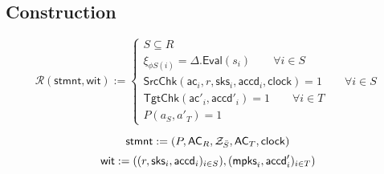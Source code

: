 \documentclass{article}      	%
\begin{document}
\subsection*{Construction}

\begin{equation*}
\mathcal{R}(\mathsf{stmnt}, \mathsf{wit}) := \begin{cases} 
    S \subseteq R \\ 
    \xi_{\phi S(i)} = \Delta.\mathsf{Eval}(s_i) \qquad \forall i \in S \\
    \mathsf{SrcChk}(\mathsf{ac}_i, r, \mathsf{sks}_i, \mathsf{accd}_i, \mathsf{clock}) = 1 \qquad \forall i \in S \\ 
    \mathsf{TgtChk}(\mathsf{ac'}_i, \mathsf{accd}'_i) = 1 \qquad \forall i \in T \\ 
    P(a_S, a'_T) = 1
\end{cases}
\end{equation*}

\begin{equation*}
\mathsf{stmnt} := (P,\mathsf{AC}_R,\mathcal{Z}_{\bar{S}}, \mathsf{AC}_T, \mathsf{clock}) \\
\end{equation*}
\begin{equation*}
\mathsf{wit} := ((r,\mathsf{sks}_i, \mathsf{accd}_i)_{i\in S}), (\mathsf{mpks}_i, \mathsf{accd}'_i)_{i\in T}) \\
\end{equation*}
\end{document}
